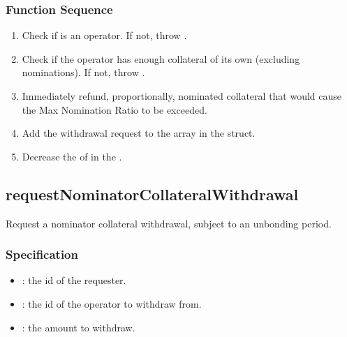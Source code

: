 \documentclass[a4paper,10pt,english]{sphinxmanual}
\begin{document}
\subsubsection{Function Sequence}
\label{\detokenize{spec/nomination:id20}}\begin{enumerate}
%
\item {} 
Check if  is an operator. If not, throw .

\item {} 
Check if the operator has enough collateral of its own (excluding nominations). If not, throw .

\item {} 
Immediately refund, proportionally, nominated collateral that would cause the Max Nomination Ratio to be exceeded.

\item {} 
Add the withdrawal request to the  array in the  struct.

\item {} 
Decrease the  of  in the {\hyperref[\detokenize{spec/vault-registry:vault-registry}]{}}.

\end{enumerate}


\subsection{requestNominatorCollateralWithdrawal}
\label{\detokenize{spec/nomination:requestnominatorcollateralwithdrawal}}\label{\detokenize{spec/nomination:id21}}
Request a nominator collateral withdrawal, subject to an unbonding period.


\subsubsection{Specification}
\label{\detokenize{spec/nomination:id22}}


\begin{itemize}
\item {} 
: the id of the requester.

\item {} 
: the id of the operator to withdraw from.

\item {} 
: the amount to withdraw.

\end{itemize}
\end{document}
